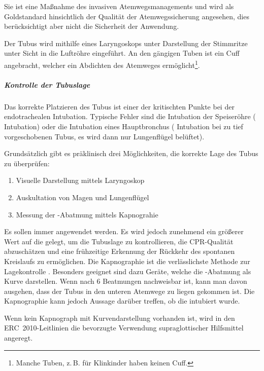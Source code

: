 { Sie ist eine Maßnahme des invasiven
Atemwegsmanagements und wird als Goldstandard hinsichtlich
der Qualität der Atemwegssicherung angesehen, dies
berücksichtigt aber nicht die Sicherheit der Anwendung.

Der Tubus wird mithilfe eines Laryngoskops unter Darstellung
der Stimmritze unter Sicht in die Luftröhre eingeführt.
An den gängigen Tuben ist ein Cuff angebracht, welcher ein
Abdichten des Atemweges ermöglicht\footnote{Manche Tuben,
z.\,B. für Klinkinder haben keinen Cuff.}.

\subparagraph{Kontrolle der Tubuslage}
Das korrekte Platzieren des Tubus ist einer der kritischten
Punkte bei der endotrachealen Intubation. Typische Fehler
sind die Intubation der Speiseröhre (
Intubation) oder die Intubation eines Hauptbronchus
( Intubation bei zu tief vorgeschobenen Tubus, 
es wird dann nur  Lungenflügel belüftet).

Grundsätzlich gibt es präklinisch drei Möglichkeiten, die
korrekte Lage des Tubus zu überprüfen:
\begin{enumerate}
  \item Visuelle Darstellung mittels Laryngoskop
  \item Auskultation von Magen und Lungenflügel
  \item Messung der -Abatmung mittels Kapnograhie
\end{enumerate}
Es sollen immer  angewendet werden.
Es wird jedoch zunehmend ein größerer Wert auf die
 gelegt, um die Tubuslage zu kontrollieren,
die CPR-Qualität abzuschätzen und eine frühzeitige Erkennung
der Rückkehr des spontanen Kreislaufs zu ermöglichen. Die
Kapnographie ist die verlässlichste Methode zur
Lagekontrolle \cite{Grmec2002}. Besonders
geeignet sind dazu Geräte, welche die -Abatmung als Kurve darstellen. Wenn nach 6
Beatmungen  nachweisbar ist, kann man davon
ausgehen, dass der Tubus in den unteren Atemwege zu liegen
gekommen ist. Die Kapnographie kann jedoch  Aussage
darüber treffen, ob die  intubiert wurde.

Wenn kein Kapnograph mit Kurvendarstellung vorhanden ist,
wird in den ERC~2010-Leitlinien die bevorzugte Verwendung
supraglottischer Hilfsmittel
angeregt.
}{}{}{}{}{}






